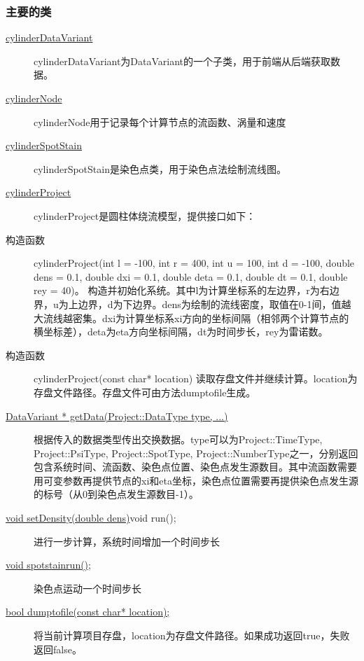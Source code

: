\documentclass[12pt]{article}
\begin{document}
\subsubsection{主要的类}
\begin{description}
\item[\underline{cylinderDataVariant}]
cylinderDataVariant为DataVariant的一个子类，用于前端从后端获取数据。

\item[\underline{cylinderNode}]
cylinderNode用于记录每个计算节点的流函数、涡量和速度

\item[\underline{cylinderSpotStain}]
cylinderSpotStain是染色点类，用于染色点法绘制流线图。

\item[\underline{cylinderProject}]
cylinderProject是圆柱体绕流模型，提供接口如下：
\item[构造函数]cylinderProject(int l = -100, int r = 400, int u = 100, int d = -100, double dens = 0.1, double dxi = 0.1, double deta = 0.1, double dt = 0.1, double rey = 40)。
构造并初始化系统。其中l为计算坐标系的左边界，r为右边界，u为上边界，d为下边界。dens为绘制的流线密度，取值在0-1间，值越大流线越密集。dxi为计算坐标系xi方向的坐标间隔（相邻两个计算节点的横坐标差），deta为eta方向坐标间隔，dt为时间步长，rey为雷诺数。

\item[构造函数]cylinderProject(const char* location)
读取存盘文件并继续计算。location为存盘文件路径。存盘文件可由方法dumptofile生成。
 
\item[\underline{DataVariant * getData(Project::DataType type, ...)}]
根据传入的数据类型传出交换数据。type可以为Project::TimeType, Project::PsiType, Project::SpotType, Project::NumberType之一，分别返回包含系统时间、流函数、染色点位置、染色点发生源数目。其中流函数需要用可变参数再提供节点的xi和eta坐标，染色点位置需要再提供染色点发生源的标号（从0到染色点发生源数目-1）。

\item[\underline{void setDensity(double dens)}void run();]
进行一步计算，系统时间增加一个时间步长

\item[\underline{void spotstainrun();}]
染色点运动一个时间步长

\item[\underline {bool dumptofile(const char* location);}]
将当前计算项目存盘，location为存盘文件路径。如果成功返回true，失败返回false。


\end{description}
\end{document}
